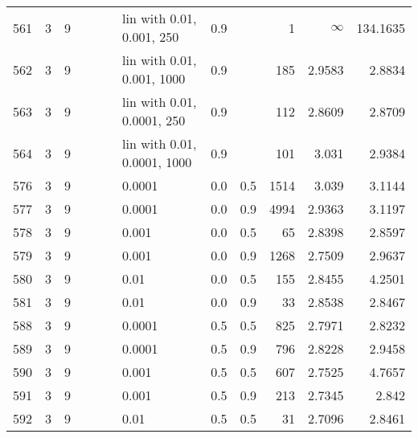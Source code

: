 \begin{longtable}{lrrrrrlrrrrr}
  561 &       3 & 9 &   &   &   &   lin with 0.01, 0.001, 250 &      0.9 &        &       1 &               $\infty$ &               134.1635 \\
  562 &       3 & 9 &   &   &   &  lin with 0.01, 0.001, 1000 &      0.9 &        &     185 &                 2.9583 &                 2.8834 \\
  563 &       3 & 9 &   &   &   &  lin with 0.01, 0.0001, 250 &      0.9 &        &     112 &                 2.8609 &                 2.8709 \\
  564 &       3 & 9 &   &   &   & lin with 0.01, 0.0001, 1000 &      0.9 &        &     101 &                  3.031 &                 2.9384 \\
  576 &       3 & 9 &   &   &   &                      0.0001 &      0.0 &    0.5 &    1514 &                  3.039 &                 3.1144 \\
  577 &       3 & 9 &   &   &   &                      0.0001 &      0.0 &    0.9 &    4994 &                 2.9363 &                 3.1197 \\
  578 &       3 & 9 &   &   &   &                       0.001 &      0.0 &    0.5 &      65 &                 2.8398 &                 2.8597 \\
  579 &       3 & 9 &   &   &   &                       0.001 &      0.0 &    0.9 &    1268 &                 2.7509 &                 2.9637 \\
  580 &       3 & 9 &   &   &   &                        0.01 &      0.0 &    0.5 &     155 &                 2.8455 &                 4.2501 \\
  581 &       3 & 9 &   &   &   &                        0.01 &      0.0 &    0.9 &      33 &                 2.8538 &                 2.8467 \\
  588 &       3 & 9 &   &   &   &                      0.0001 &      0.5 &    0.5 &     825 &                 2.7971 &                 2.8232 \\
  589 &       3 & 9 &   &   &   &                      0.0001 &      0.5 &    0.9 &     796 &                 2.8228 &                 2.9458 \\
  590 &       3 & 9 &   &   &   &                       0.001 &      0.5 &    0.5 &     607 &                 2.7525 &                 4.7657 \\
  591 &       3 & 9 &   &   &   &                       0.001 &      0.5 &    0.9 &     213 &                 2.7345 &                  2.842 \\
  592 &       3 & 9 &   &   &   &                        0.01 &      0.5 &    0.5 &      31 &                 2.7096 &                 2.8461 \\

\end{longtable}
